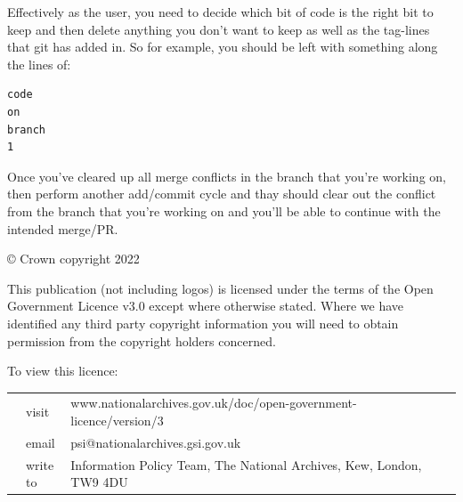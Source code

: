 \documentclass[
  12pt,
]{article}
\begin{document}
Effectively as the user, you need to decide which bit of code is the
right bit to keep and then delete anything you don't want to keep as
well as the tag-lines that git has added in. So for example, you should
be left with something along the lines of:

\begin{verbatim}
code 
on 
branch 
1
\end{verbatim}

Once you've cleared up all merge conflicts in the branch that you're
working on, then perform another add/commit cycle and thay should clear
out the conflict from the branch that you're working on and you'll be
able to continue with the intended merge/PR.

\newpage

\vspace*{\fill}
\color{black}

© Crown copyright 2022

This publication (not including logos) is licensed under the terms of
the Open Government Licence v3.0 except where otherwise stated. Where we
have identified any third party copyright information you will need to
obtain permission from the copyright holders concerned.

To view this licence:

\begin{tabular}{p{0.02\linewidth} p{0.1\linewidth} p{0.88\linewidth}}
& visit & www.nationalarchives.gov.uk/doc/open-government-licence/version/3 \\
& email & psi@nationalarchives.gsi.gov.uk \\
& write to & Information Policy Team, The National Archives, Kew, London, TW9 4DU \\
\end{tabular}
\end{document}
